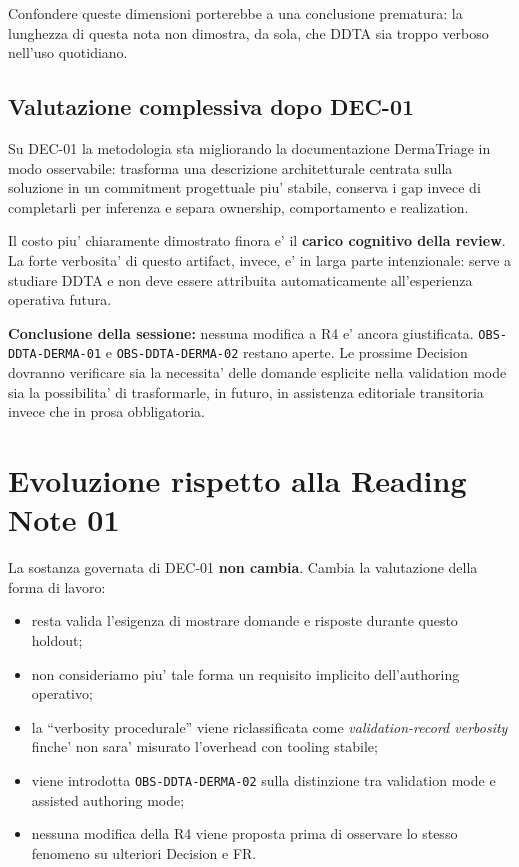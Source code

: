\documentclass[11pt,a4paper]{article}
\begin{document}
Confondere queste dimensioni porterebbe a una conclusione prematura: la lunghezza di questa nota non dimostra, da sola, che DDTA sia troppo verboso nell'uso quotidiano.

\subsection{Valutazione complessiva dopo DEC-01}

\begin{ddtacore}[title={Valutazione provvisoria}]
Su DEC-01 la metodologia sta migliorando la documentazione DermaTriage in modo osservabile: trasforma una descrizione architetturale centrata sulla soluzione in un commitment progettuale piu' stabile, conserva i gap invece di completarli per inferenza e separa ownership, comportamento e realization.

Il costo piu' chiaramente dimostrato finora e' il \textbf{carico cognitivo della review}. La forte verbosita' di questo artifact, invece, e' in larga parte intenzionale: serve a studiare DDTA e non deve essere attribuita automaticamente all'esperienza operativa futura.

\textbf{Conclusione della sessione:} nessuna modifica a R4 e' ancora giustificata. \texttt{OBS-DDTA-DERMA-01} e \texttt{OBS-DDTA-DERMA-02} restano aperte. Le prossime Decision dovranno verificare sia la necessita' delle domande esplicite nella validation mode sia la possibilita' di trasformarle, in futuro, in assistenza editoriale transitoria invece che in prosa obbligatoria.
\end{ddtacore}

\section{Evoluzione rispetto alla Reading Note 01}

La sostanza governata di DEC-01 \textbf{non cambia}. Cambia la valutazione della forma di lavoro:
\begin{itemize}
  \item resta valida l'esigenza di mostrare domande e risposte durante questo holdout;
  \item non consideriamo piu' tale forma un requisito implicito dell'authoring operativo;
  \item la ``verbosity procedurale'' viene riclassificata come \emph{validation-record verbosity} finche' non sara' misurato l'overhead con tooling stabile;
  \item viene introdotta \texttt{OBS-DDTA-DERMA-02} sulla distinzione tra validation mode e assisted authoring mode;
  \item nessuna modifica della R4 viene proposta prima di osservare lo stesso fenomeno su ulteriori Decision e FR.
\end{itemize}
\end{document}
